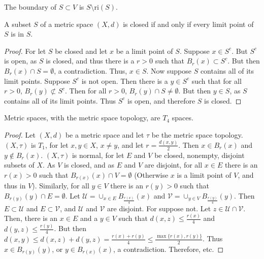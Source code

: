 \documentclass[crop=false,class=book,oneside]{standalone}
\begin{document}
            \begin{definition}
            The boundary of $S\subset V$ is $S\setminus \textrm{ri}(S)$.
            \end{definition}
            \begin{theorem}
            A subset $S$ of a metric space $(X,d)$ is closed if and only if every limit point of $S$ is in $S$.
            \end{theorem}
            \begin{proof}
            For let $S$ be closed and let $x$ be a limit point of $S$. Suppose $x\in S^c$. But $S^c$ is open, as $S$ is closed, and thus there is a $r>0$ such that $B_{r}(x)\subset S^c$. But then $B_{r}(x)\cap S = \emptyset$, a contradiction. Thus, $x\in S$. Now suppose $S$ contains all of its limit points. Suppose $S^c$ is not open. Then there is a $y\in S^c$ such that for all $r>0$, $B_{r}(y)\not \subset S^c$. Then for all $r>0$, $B_{r}(y)\cap S \ne \emptyset$. But then $y\in S$, as $S$ contains all of its limit points. Thus $S^c$ is open, and therefore $S$ is closed.
            \end{proof}
            \begin{theorem}
            Metric spaces, with the metric space topology, are $T_4$ spaces.
            \end{theorem}
            \begin{proof}
            Let $(X,d)$ be a metric space and let $\tau$ be the metric space topology. $(X,\tau)$ is $T_1$, for let $x,y\in X$, $x\ne y$, and let $r= \frac{d(x,y)}{2}$. Then $x\in B_{r}(x)$ and $y\notin B_{r}(x)$. $(X,\tau)$ is normal, for let $E$ and $V$ be closed, nonempty, disjoint subsets of $X$. As $V$ is closed, and as $E$ and $V$ are disjoint, for all $x\in E$ there is an $r(x)>0$ such that $B_{r(x)}(x)\cap V = \emptyset$ (Otherwise $x$ is a limit point of $V$, and thus in $V$). Similarly, for all $y\in V$ there is an $r(y)>0$ such that $B_{r(y)}(y)\cap E = \emptyset$. Let $\mathcal{U} = \cup_{x\in E}B_{\frac{r(x)}{4}}(x)$ and $\mathcal{V} = \cup_{y\in V}B_{\frac{r(y)}{4}}(y)$. Then $E\subset \mathcal{U}$ and $E\subset \mathcal{V}$, and $\mathcal{U}$ and $\mathcal{V}$ are disjoint. For suppose not. Let $z\in \mathcal{U}\cap \mathcal{V}$. Then, there is an $x\in E$ and a $y\in V$ such that $d(x,z)\leq \frac{r(x)}{4}$ and $d(y,z)\leq \frac{r(y)}{4}$. But then $d(x,y) \leq d(x,z)+d(y,z) = \frac{r(x)+r(y)}{4} \leq \frac{\max\{r(x),r(y)\}}{2}$. Thus $x\in B_{r(y)}(y)$, or $y\in B_{r(x)}(x)$, a contradiction. Therefore, etc.
            \end{proof}
\end{document}
